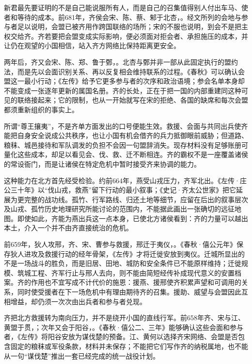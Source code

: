 新君最先要证明的不是自己能说服所有人，而是自己的召集值得别人付出车马、使者和等待的成本。前681年，齐侯会宋、陈、蔡、邾于北杏，。经文所列的会地与参与者足以说明，会盟已被齐用作跨国联络的场所；宋的不服也说明，到会不是把主权交给齐。齐若要把会盟变成实际影响，便必须面对拒会者、承担施压的成本，并让仍在观望的小国相信，站入齐方网络比保持距离更安全。

两年后，齐又会宋、陈、郑、鲁于鄄，。北杏与鄄并非一部从此固定执行的盟约法，而是先以会面识别关系、再以反复相会维持联系的过程。《春秋》可以确认会盟这一最小行动；《左传》给予它更多参与者的次序和政治语境；参会名单本身却不能变成一张逐年更新的属国名册。齐的长处，正在于把一国的内部重建同这种可见的联络接起来；它的限制，也从一开始就写在宋的拒绝、各国的缺席和每次会盟都须重新组织的事实上。

\begin{turningpoint}[会盟首先是一种昂贵的协调]
所谓“尊王攘夷”，不是齐单方面发出的口号便能生效。救援、会面与共同出兵使齐能把自身安全说成公共秩序，也让小国有机会借齐的兵力抵御眼前威胁；但道路、粮秣、城邑接待和军队调发的负担不会因一句盟辞消失。现存材料没有足够账册可量化这些成本，却足以看见会、伐、救、迁不断相连。齐的霸权不是一座覆盖诸侯的常设衙门，而是让诸侯在特定危机中暂时接受齐来协调的能力。
\end{turningpoint}

这种能力在北方首先经受检验。约前664年，燕受山戎压力，齐军北出。《左传·庄公三十年》以“伐山戎，救燕”留下行动的最小叙事；《史记·齐太公世家》把它延展为更完整的战功线。孤竹、行军路线、归还土地等细节，应留在后出的叙事层次及山戎、孤竹历史地理研究所能讨论的范围内，不能据此画出一张确切的远征地图。即使如此，齐能为燕出兵这一点本身，已使北方诸侯看到：齐的力量可以越出本土，介入一个并不由齐直接统治的危机。

前659年，狄人攻邢，齐、宋、曹参与救援，邢迁于夷仪，。《春秋·僖公元年》保存狄人进攻及救援行动的经年骨架，《左传》才将迁徙安放到夷仪。迁城所显出的不是一场战斗的胜负，而是旧居、田地、城防和安全条件已不能原样维持；迁徙规模、筑城工程、齐军行止与邢人去向，则不能由简短经传补成现代意义的安置档案。齐的作用也不宜写成不计代价的施恩：援燕、援邢使齐积累声望和可调用的关系，同时使受援者在下一场危机中有理由期待齐的召集。援助、威望与会盟因此互相增益，却仍须一次次由出兵者和参与者兑现。

齐把北方救援转为南向压力，并不是绕开小国的直线行军。前658年齐、宋与江、黄盟于贯，；次年又会于阳谷，。《春秋·僖公二、三年》能够确认这些会面和参与者，《左传》将阳谷安放为谋伐楚的预备。江、黄何以选择齐宋网络、会盟是否包含固定的粮秣或军役条款，材料并未保存；不能把它们写作齐的纳税属地，也不能从一句“谋伐楚”推出一套已经完成的统一战役计划。

